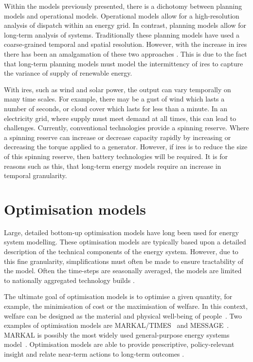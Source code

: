 Within the models previously presented, there is a dichotomy between planning models and operational models. Operational models allow for a high-resolution analysis of dispatch within an energy grid. In contrast, planning models allow for long-term analysis of systems. Traditionally these planning models have used a coarse-grained temporal and spatial resolution. However, with the increase in \acrshort{ires} there has been an amalgamation of these two approaches \cite{Pfenninger2014a}. This is due to the fact that long-term planning models must model the intermittency of \acrshort{ires} to capture the variance of supply of renewable energy.

With \acrshort{ires}, such as wind and solar power, the output can vary temporally on many time scales. For example, there may be a gust of wind which lasts a number of seconds, or cloud cover which lasts for less than a minute. In an electricity grid, where supply must meet demand at all times, this can lead to challenges. Currently, conventional technologies provide a spinning reserve. Where a spinning reserve can increase or decrease capacity rapidly by increasing or decreasing the torque applied to a generator. However, if \acrshort{ires} is to reduce the size of this spinning reserve, then battery technologies will be required. It is for reasons such as this, that long-term energy models require an increase in temporal granularity.





\section{Optimisation models}
\label{sec:litreview:optimisation}


Large, detailed bottom-up optimisation models have long been used for energy system modelling. These optimisation models are typically based upon a detailed description of the technical components of the energy system. However, due to this fine granularity, simplifications must often be made to ensure tractability of the model. Often the time-steps are seasonally averaged, the models are limited to nationally aggregated technology builds \cite{Pfenninger2014}.

The ultimate goal of optimisation models is to optimise a given quantity, for example, the minimisation of cost or the maximisation of welfare. In this context, welfare can be designed as the material and physical well-being of people~\cite{Keles2017}. Two examples of optimisation models are MARKAL/TIMES~\cite{Fishbone1981} and MESSAGE~\cite{Schrattenholzer1981}. MARKAL is possibly the most widely used general-purpose energy systems model~\cite{Pfenninger2014}. Optimisation models are able to provide prescriptive, policy-relevant insight and relate near-term actions to long-term outcomes \cite{DeCarolis2012}.

